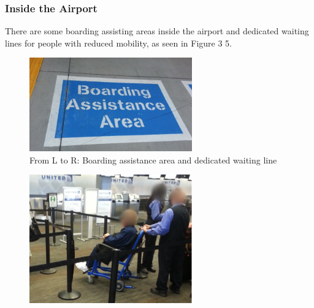 \subsubsection{Inside the Airport}
\begin{list}{-}{}
  \item There are some boarding assisting areas inside the airport and dedicated waiting lines for people with reduced mobility, as seen in Figure 3 5.

\begin{figure}[h]
  \centering
     \includegraphics[width=7cm]{images/image032}
   \caption{From L to R: Boarding assistance area and dedicated waiting line}
  \label{fig:32}
\end{figure}
\begin{figure}[h]
  \centering
     \includegraphics[width=7cm]{images/image033}
  \label{fig:33}
\end{figure}


\end{list}
